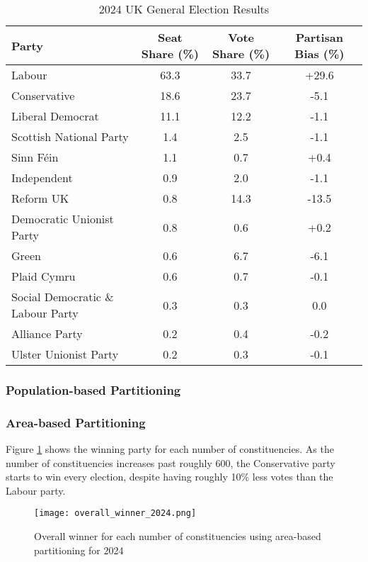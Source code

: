 \documentclass{article}
\begin{document}
\begin{table}[H]
    \centering
    \begin{tabular}{l|c|c|c}
        \hline
        \textbf{Party} & \textbf{Seat Share (\%)} & \textbf{Vote Share (\%)} & \textbf{Partisan Bias (\%)} \\
        \hline
        Labour & 63.3 & 33.7 & +29.6 \\
        Conservative & 18.6 & 23.7 & -5.1 \\
        Liberal Democrat & 11.1 & 12.2 & -1.1 \\
        Scottish National Party & 1.4 & 2.5 & -1.1 \\
        Sinn Féin & 1.1 & 0.7 & +0.4 \\
        Independent & 0.9 & 2.0 & -1.1 \\
        Reform UK & 0.8 & 14.3 & -13.5 \\
        Democratic Unionist Party & 0.8 & 0.6 & +0.2 \\
        Green & 0.6 & 6.7 & -6.1 \\
        Plaid Cymru & 0.6 & 0.7 & -0.1 \\
        Social Democratic \& Labour Party & 0.3 & 0.3 & 0.0 \\
        Alliance Party & 0.2 & 0.4 & -0.2 \\
        Ulster Unionist Party & 0.2 & 0.3 & -0.1 \\
        \hline
    \end{tabular}
    \caption{2024 UK General Election Results}
    \label{tab:uk2024}
\end{table}

\subsubsection{Population-based Partitioning}


\subsubsection{Area-based Partitioning}

Figure \ref{fig:overall_winner_2024} shows the winning party for each number of constituencies. As the number of constituencies increases past roughly 600, 
the Conservative party starts to win every election, despite having roughly 10\% less votes than the Labour party.

\begin{figure}[H]
    \centering
    \texttt{[image: overall\_winner\_2024.png]}
    \caption{Overall winner for each number of constituencies using area-based partitioning for 2024}
    \label{fig:overall_winner_2024}
\end{figure}
\end{document}
